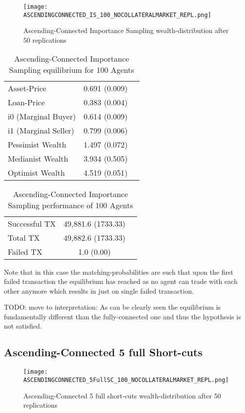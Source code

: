 \documentclass[Bachelorarbeit.tex]{subfiles}
\begin{document}
\begin{figure}[!htbp]
	\centering
  \texttt{[image: ASCENDINGCONNECTED\_IS\_100\_NOCOLLATERALMARKET\_REPL.png]}
	\caption{Ascending-Connected Importance Sampling wealth-distribution after 50 replications}
	\label{fig1}
\end{figure}

\begin{table}[h]
	\caption{Ascending-Connected Importance Sampling equilibrium for 100 Agents}
	\centering
	\begin{tabular} { l c r }
		\hline
		Asset-Price & 0.691 (0.009) \\
		Loan-Price & 0.383 (0.004) \\
		i0 (Marginal Buyer) & 0.614 (0.009) \\
		i1 (Marginal Seller) & 0.799 (0.006) \\
		Pessimist Wealth & 1.497 (0.072) \\
		Medianist Wealth & 3.934 (0.505) \\
		Optimist Wealth & 4.519 (0.051) \\
		\hline
	\end{tabular}
\end{table} 

\begin{table}[h]
	\caption{Ascending-Connected Importance Sampling performance of 100 Agents}
	\centering
	\begin{tabular} { l c r }
		\hline
		Successful TX & 49,881.6 (1733.33) \\
		Total TX & 49,882.6 (1733.33) \\
		Failed TX & 1.0 (0.00) \\
		\hline
	\end{tabular}
\end{table}

Note that in this case the matching-probabilities are such that upon the first failed transaction the equilibrium has reached as no agent can trade with each other anymore which results in just on single failed transaction.

TODO: move to interpretation: As can be clearly seen the equilibrium is fundamentally different than the fully-connected one and thus the hypothesis is not satisfied.

\subsection{Ascending-Connected 5 full Short-cuts }
\begin{figure}[!htbp]
	\centering
  \texttt{[image: ASCENDINGCONNECTED\_5FullSC\_100\_NOCOLLATERALMARKET\_REPL.png]}
	\caption{Ascending-Connected 5 full short-cuts wealth-distribution after 50 replications}
	\label{fig1}
\end{figure}
\end{document}
